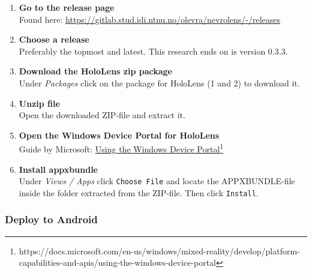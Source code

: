 \begin{enumerate}
    \item {
        \textbf{Go to the release page}\\
        Found here: \url{https://gitlab.stud.idi.ntnu.no/olevra/nevrolens/-/releases}
    }
    \item {
        \textbf{Choose a release}\\
        Preferably the topmost and latest. This research ends on is version 0.3.3. 
    }

    \item {
        \textbf{Download the HoloLens zip package}\\
        Under \textit{Packages} click on the package for HoloLens (1 and 2) to download it.
    }

    \item {
        \textbf{Unzip file}\\
        Open the downloaded ZIP-file and extract it.
    }

    \item {
        \textbf{Open the Windows Device Portal for HoloLens}\\
        Guide by Microsoft: \href{https://docs.microsoft.com/en-us/windows/mixed-reality/develop/platform-capabilities-and-apis/using-the-windows-device-portal}{Using the Windows Device Portal}\footnote{https://docs.microsoft.com/en-us/windows/mixed-reality/develop/platform-capabilities-and-apis/using-the-windows-device-portal}
    }
    \item {
        \textbf{Install appxbundle}\\
        Under \textit{Views / Apps} click \texttt{Choose File} and locate the APPXBUNDLE-file inside the folder extracted from the ZIP-file. Then click \texttt{Install}.
    }

\end{enumerate}

\subsubsection{Deploy to Android}


